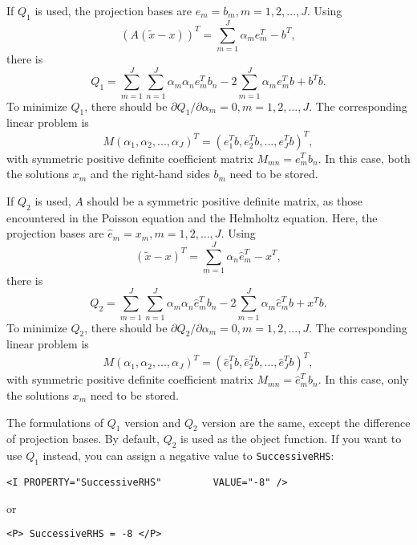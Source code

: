 If $Q_1$ is used, the projection bases are $e_m = b_m, m = 1, 2, ..., J$. Using
\begin{equation}\label{eq:Atildex}
\left(A(\tilde{x}-x) \right)^T= \sum_{m=1}^J\alpha_me_m^T - b^T,
\end{equation}
there is
\begin{equation}\label{eq:objectFunctionQ1_v2}
Q_1= \sum_{m=1}^J\sum_{n=1}^J\alpha_m\alpha_n e_m^T b_n - 2 \sum_{m=1}^J \alpha_m e_m^T b + b^T b.
\end{equation}
To minimize $Q_1$, there should be $\partial Q_1/\partial \alpha_m =0, m=1, 2, ..., J$.
The corresponding linear problem is
\begin{equation}\label{eq:objectFunctionQ1_solution}
M (\alpha_1, \alpha_2, ..., \alpha_J)^T =   (e_1^Tb, e_2^Tb, ..., e_J^Tb)^T,
\end{equation}
with symmetric positive definite coefficient matrix $M_{mn}=e_m^T b_n$. In this case, both the solutions $x_m$ and the right-hand sides $b_m$ need to be stored.

If $Q_2$ is used, $A$ should be a symmetric positive definite matrix, as those encountered in the Poisson equation and the Helmholtz equation. Here, the projection bases are $\hat{e}_m = x_m, m = 1, 2, ..., J$. Using
\begin{equation}\label{eq:tildex}
(\tilde{x}-x) ^T= \sum_{m=1}^J\alpha_n\hat{e}_m^T - x^T,
\end{equation}
there is
\begin{equation}\label{eq:objectFunctionQ2_v2}
Q_2= \sum_{m=1}^J\sum_{n=1}^J\alpha_m\alpha_n \hat{e}_m^T b_n - 2 \sum_{m=1}^J \alpha_m \hat{e}_m^T b + x^T b.
\end{equation}
To minimize $Q_2$, there should be $\partial Q_2/\partial \alpha_m =0, m=1, 2, ..., J$.
The corresponding linear problem is
\begin{equation}\label{eq:objectFunctionQ2_solution}
M (\alpha_1, \alpha_2, ..., \alpha_J)^T =   (\hat{e}_1^Tb, \hat{e}_2^Tb, ..., \hat{e}_J^Tb)^T,
\end{equation}
with symmetric positive definite coefficient matrix $M_{mn}=\hat{e}_m^T b_n$. In this case, only the solutions $x_m$ need to be stored.

The formulations of $Q_1$ version and $Q_2$ version are the same, except the difference of projection bases. By default, $Q_2$ is used as the object function. If you want to use $Q_1$ instead, you can assign a negative value to \texttt{SuccessiveRHS}:
\begin{lstlisting}[style=XMLStyle]
<I PROPERTY="SuccessiveRHS"         VALUE="-8" />
\end{lstlisting}
or
\begin{lstlisting}[style=XMLStyle]
<P> SuccessiveRHS = -8 </P>
\end{lstlisting}

